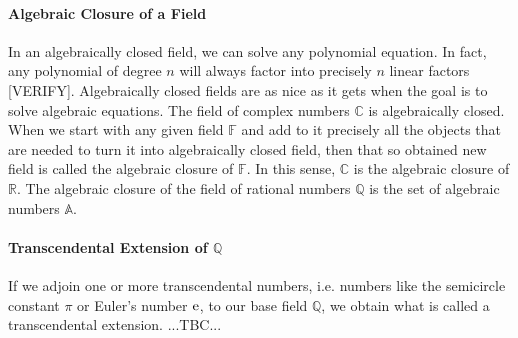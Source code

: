 


\paragraph{Algebraic Closure of a Field}
In an algebraically closed field, we can solve any polynomial equation. In fact, any polynomial of degree $n$ will always factor into precisely $n$ linear factors [VERIFY]. Algebraically closed fields are as nice as it gets when the goal is to solve algebraic equations. The field of complex numbers $\mathbb{C}$ is algebraically closed. When we start with any given field $\mathbb{F}$ and add to it precisely all the objects that are needed to turn it into algebraically closed field, then that so obtained new field is called the algebraic closure of $\mathbb{F}$. In this sense, $\mathbb{C}$ is the algebraic closure of $\mathbb{R}$. The algebraic closure of the field of rational numbers $\mathbb{Q}$ is the set of algebraic numbers $\mathbb{A}$. 




\paragraph{Transcendental Extension of $\mathbb{Q}$}
If we adjoin one or more transcendental numbers, i.e. numbers like the semicircle constant $\pi$ or Euler's number $\operatorname{\mathrm{e}}$, to our base field $\mathbb{Q}$, we obtain what is called a transcendental extension. ...TBC...

